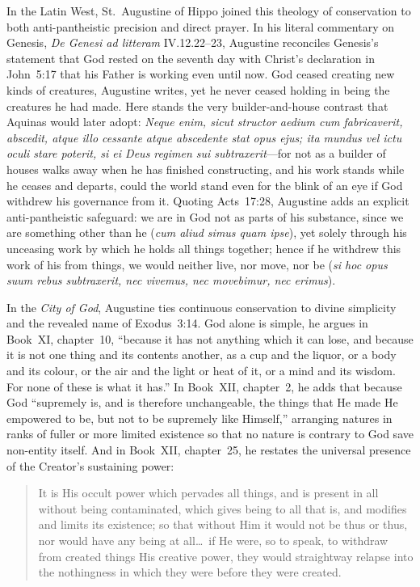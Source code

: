 In the Latin West, St.\ Augustine of Hippo joined this theology of conservation to both anti-pantheistic precision and direct prayer. In his literal commentary on Genesis, \emph{De Genesi ad litteram} IV.12.22--23, Augustine reconciles Genesis's statement that God rested on the seventh day with Christ's declaration in John~5:17 that his Father is working even until now. God ceased creating new kinds of creatures, Augustine writes, yet he never ceased holding in being the creatures he had made. Here stands the very builder-and-house contrast that Aquinas would later adopt: \emph{Neque enim, sicut structor aedium cum fabricaverit, abscedit, atque illo cessante atque abscedente stat opus ejus; ita mundus vel ictu oculi stare poterit, si ei Deus regimen sui subtraxerit}---for not as a builder of houses walks away when he has finished constructing, and his work stands while he ceases and departs, could the world stand even for the blink of an eye if God withdrew his governance from it. Quoting Acts~17:28, Augustine adds an explicit anti-pantheistic safeguard: we are in God not as parts of his substance, since we are something other than he (\emph{cum aliud simus quam ipse}), yet solely through his unceasing work by which he holds all things together; hence if he withdrew this work of his from things, we would neither live, nor move, nor be (\emph{si hoc opus suum rebus subtraxerit, nec vivemus, nec movebimur, nec erimus}).

In the \emph{City of God}, Augustine ties continuous conservation to divine simplicity and the revealed name of Exodus~3:14. God alone is simple, he argues in Book~XI, chapter~10, ``because it has not anything which it can lose, and because it is not one thing and its contents another, as a cup and the liquor, or a body and its colour, or the air and the light or heat of it, or a mind and its wisdom. For none of these is what it has.'' In Book~XII, chapter~2, he adds that because God ``supremely is, and is therefore unchangeable, the things that He made He empowered to be, but not to be supremely like Himself,'' arranging natures in ranks of fuller or more limited existence so that no nature is contrary to God save non-entity itself. And in Book~XII, chapter~25, he restates the universal presence of the Creator's sustaining power:

\begin{quote}
It is His occult power which pervades all things, and is present in all without being contaminated, which gives being to all that is, and modifies and limits its existence; so that without Him it would not be thus or thus, nor would have any being at all\dots\ if He were, so to speak, to withdraw from created things His creative power, they would straightway relapse into the nothingness in which they were before they were created.
\end{quote}

